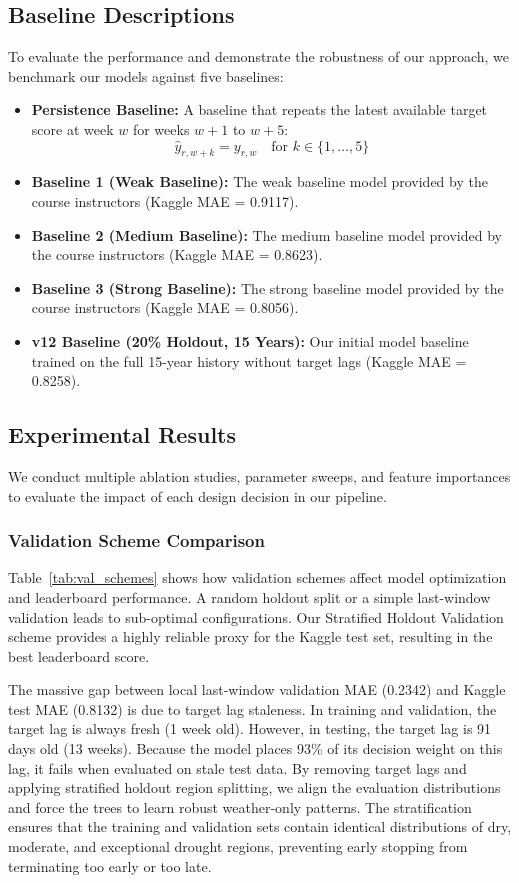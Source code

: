 \documentclass[conference]{IEEEtran}
\begin{document}
\subsection{Baseline Descriptions}
To evaluate the performance and demonstrate the robustness of our approach, we benchmark our models against five baselines:
\begin{itemize}
    \item \textbf{Persistence Baseline:} A baseline that repeats the latest available target score at week $w$ for weeks $w+1$ to $w+5$:
    \begin{equation}
        \hat{y}_{r, w+k} = y_{r, w} \quad \text{for } k \in \{1, \dots, 5\}
    \end{equation}
    \item \textbf{Baseline 1 (Weak Baseline):} The weak baseline model provided by the course instructors (Kaggle MAE = 0.9117).
    \item \textbf{Baseline 2 (Medium Baseline):} The medium baseline model provided by the course instructors (Kaggle MAE = 0.8623).
    \item \textbf{Baseline 3 (Strong Baseline):} The strong baseline model provided by the course instructors (Kaggle MAE = 0.8056).
    \item \textbf{v12 Baseline (20\% Holdout, 15 Years):} Our initial model baseline trained on the full 15-year history without target lags (Kaggle MAE = 0.8258).
\end{itemize}

\subsection{Experimental Results}
We conduct multiple ablation studies, parameter sweeps, and feature importances to evaluate the impact of each design decision in our pipeline.

\subsubsection{Validation Scheme Comparison}
Table~\ref{tab:val_schemes} shows how validation schemes affect model optimization and leaderboard performance. A random holdout split or a simple last-window validation leads to sub-optimal configurations. Our Stratified Holdout Validation scheme provides a highly reliable proxy for the Kaggle test set, resulting in the best leaderboard score.

The massive gap between local last-window validation MAE (0.2342) and Kaggle test MAE (0.8132) is due to target lag staleness. In training and validation, the target lag is always fresh (1 week old). However, in testing, the target lag is 91 days old (13 weeks). Because the model places 93\% of its decision weight on this lag, it fails when evaluated on stale test data. By removing target lags and applying stratified holdout region splitting, we align the evaluation distributions and force the trees to learn robust weather-only patterns. The stratification ensures that the training and validation sets contain identical distributions of dry, moderate, and exceptional drought regions, preventing early stopping from terminating too early or too late.
\end{document}
